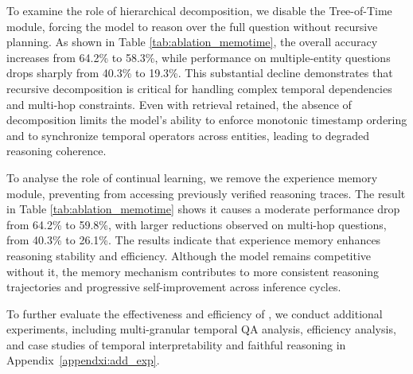 To examine the role of hierarchical decomposition, we disable the Tree-of-Time module, forcing the model to reason over the full question without recursive planning.
As shown in Table \ref{tab:ablation_memotime},
the overall accuracy increases from 64.2\% to 58.3\%, while performance on multiple-entity questions drops sharply from 40.3\% to 19.3\%.
This substantial decline demonstrates that recursive decomposition is critical for handling complex temporal dependencies and multi-hop constraints.
Even with retrieval retained, the absence of decomposition limits the model’s ability to enforce monotonic timestamp ordering and to synchronize temporal operators across entities, leading to degraded reasoning coherence.

To analyse the role of continual learning, we remove the experience memory module, preventing \mot from accessing previously verified reasoning traces.
The result in Table \ref{tab:ablation_memotime} shows it causes a moderate performance drop from 64.2\% to 59.8\%, with larger reductions observed on multi-hop questions, from 40.3\% to 26.1\%.
The results indicate that experience memory enhances reasoning stability and efficiency.
Although the model remains competitive without it, the memory mechanism contributes to more consistent reasoning trajectories and progressive self-improvement across inference cycles.

To further evaluate the effectiveness and efficiency of \mot, we conduct additional experiments, including multi-granular temporal QA analysis, efficiency analysis, 
and case studies of temporal interpretability and
faithful reasoning
in Appendix~\ref{appendxi:add_exp}.











